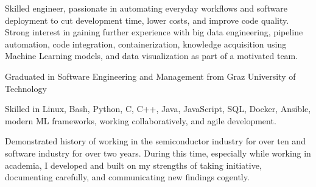 \documentclass[a4paper]{resume-cv}
\begin{document}
\lastupdated


\begin{minipage}[t]{\textwidth}
    \begin{onecolumncventry}[0.92]
    Skilled engineer, passionate in automating everyday workflows and software deployment to cut development time, lower costs, and improve code quality. Strong interest in gaining further experience with big data engineering, pipeline automation, code integration, containerization, knowledge acquisition using Machine Learning models, and data visualization as part of a motivated team.
    \subsectionsep

    Graduated in Software Engineering and Management from Graz University of Technology 
    \par Skilled in Linux, Bash, Python, C, C++, Java, JavaScript, SQL, Docker, Ansible, modern ML frameworks, working collaboratively, and agile development.
    \subsectionsep
    
    Demonstrated history of working in the semiconductor industry for over ten and software industry for over two years. During this time, especially while working in academia, I developed and built on my strengths of taking initiative, documenting carefully, and communicating new findings cogently. 
    
    \end{onecolumncventry}

    \negsubsectionsep
    

\end{minipage}
\end{document}

